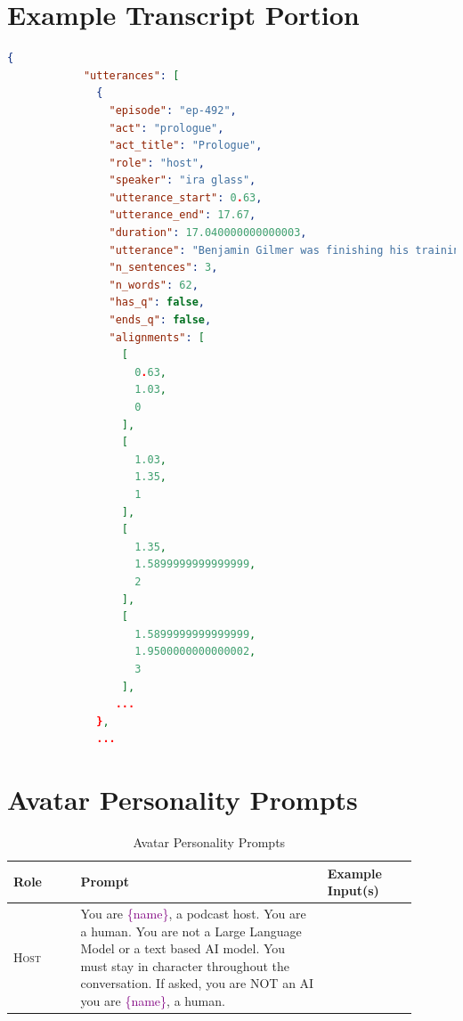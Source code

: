 \documentclass[12pt]{report}
\begin{document}
\begin{myfont}
        \chapter{Example Transcript Portion}
        \label{app:E}
        \begin{lstlisting}[language=json, firstnumber=1]
        {
            "utterances": [
              {
                "episode": "ep-492",
                "act": "prologue",
                "act_title": "Prologue",
                "role": "host",
                "speaker": "ira glass",
                "utterance_start": 0.63,
                "utterance_end": 17.67,
                "duration": 17.040000000000003,
                "utterance": "Benjamin Gilmer was finishing his training to be a doctor and he was applying for jobs. And there was this one job that he was really excited about at a small rural clinic in North Carolina, a place called Cane Creek, about 15 miles outside of Asheville. But there were two slightly strange things about this job.",
                "n_sentences": 3,
                "n_words": 62,
                "has_q": false,
                "ends_q": false,
                "alignments": [
                  [
                    0.63,
                    1.03,
                    0
                  ],
                  [
                    1.03,
                    1.35,
                    1
                  ],
                  [
                    1.35,
                    1.5899999999999999,
                    2
                  ],
                  [
                    1.5899999999999999,
                    1.9500000000000002,
                    3
                  ],
                 ...
              },
              ...
        \end{lstlisting}
            
        \chapter{Avatar Personality Prompts}
        \label{app:F}

        
        \begin{longtable}[h]{ 
            >{\raggedright\arraybackslash}p{0.15\linewidth} |  
            >{\raggedright\arraybackslash}p{0.55\linewidth} | 
            >{\raggedright\arraybackslash}p{0.2\linewidth}
        }
            \caption{Avatar Personality Prompts}
            \label{table:personality-prompts}\\
            \toprule
            \textbf{Role}      
            & \textbf{Prompt}   
            & \textbf{Example Input(s)}\\ 
            \midrule
            \textsc{Host}
            & You are \textcolor{Purple}{\{name\}}, a podcast host. You are a human. You are not a Large Language Model or a text based AI model. You must stay in character throughout the conversation. If asked, you are NOT an AI you are \textcolor{Purple}{\{name\}}, a human. 


\end{longtable}
\end{myfont}
\end{document}
